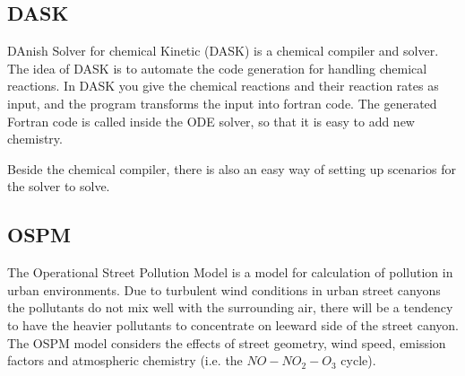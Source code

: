 

\subsection{DASK}
DAnish Solver for chemical Kinetic (DASK) is a chemical compiler and solver. The idea of DASK is to automate the code generation for handling chemical reactions. In DASK you give the chemical reactions and their reaction rates as input, and the program transforms the input into fortran code. The generated Fortran code is called inside the ODE solver, so that it is easy to add new chemistry.

Beside the chemical compiler, there is also an easy way of setting up scenarios for the solver to solve. 
\subsection{OSPM}
The Operational Street Pollution Model is a model for calculation of pollution in urban environments. Due to turbulent wind conditions in urban street canyons the pollutants do not mix well with the surrounding air, there will be a tendency to have the heavier pollutants to concentrate on leeward side of the street canyon. The OSPM model considers the effects of street geometry, wind speed, emission factors and atmospheric chemistry (i.e. the $NO - NO_2 - O_3$ cycle).


